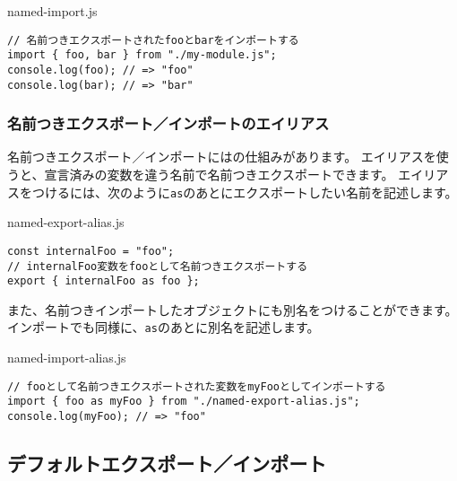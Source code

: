 \begin{listtitle}
named-import.js
\end{listtitle}
\begin{lstlisting}
// 名前つきエクスポートされたfooとbarをインポートする
import { foo, bar } from "./my-module.js";
console.log(foo); // => "foo"
console.log(bar); // => "bar"
\end{lstlisting}
\listend

\hypertarget{named-export-import-alias}{%
\subsubsection{名前つきエクスポート／インポートのエイリアス}\label{named-export-import-alias}}

名前つきエクスポート／インポートには\textbf{}の仕組みがあります。
エイリアスを使うと、宣言済みの変数を違う名前で名前つきエクスポートできます。
エイリアスをつけるには、次のように\texttt{as}のあとにエクスポートしたい名前を記述します。

\begin{listtitle}
named-export-alias.js
\end{listtitle}
\begin{lstlisting}
const internalFoo = "foo";
// internalFoo変数をfooとして名前つきエクスポートする
export { internalFoo as foo };
\end{lstlisting}
\listend

また、名前つきインポートしたオブジェクトにも別名をつけることができます。
インポートでも同様に、\texttt{as}のあとに別名を記述します。

\begin{listtitle}
named-import-alias.js
\end{listtitle}
\begin{lstlisting}
// fooとして名前つきエクスポートされた変数をmyFooとしてインポートする
import { foo as myFoo } from "./named-export-alias.js";
console.log(myFoo); // => "foo"
\end{lstlisting}
\listend

\hypertarget{default-export-import}{%
\subsection{デフォルトエクスポート／インポート}\label{default-export-import}}

